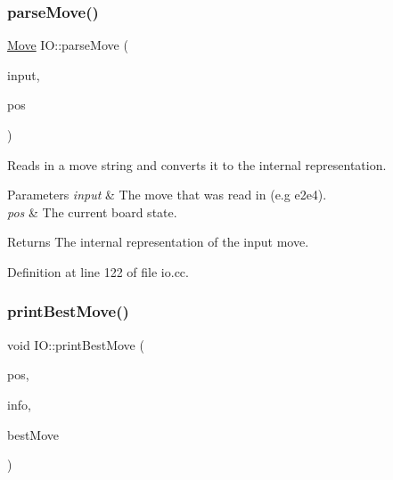 \subsubsection{\texorpdfstring{parse\+Move()}{parseMove()}}
{\footnotesize\ttfamily \mbox{\hyperlink{classMove}{Move}} I\+O\+::parse\+Move (\begin{DoxyParamCaption}\item[{std\+::string}]{input,  }\item[{const \mbox{\hyperlink{classBoard}{Board}} \&}]{pos }\end{DoxyParamCaption})\hspace{0.3cm}{\ttfamily [noexcept]}}



Reads in a move string and converts it to the internal representation. 


\begin{DoxyParams}{Parameters}
{\em input} & The move that was read in (e.\+g e2e4). \\
\hline
{\em pos} & The current board state. \\
\hline
\end{DoxyParams}
\begin{DoxyReturn}{Returns}
The internal representation of the input move. 
\end{DoxyReturn}


Definition at line 122 of file io.\+cc.

\mbox{\label{namespaceIO_a308ab394cf5fd18910986fbe556d01bb}} 
\subsubsection{\texorpdfstring{print\+Best\+Move()}{printBestMove()}}
{\footnotesize\ttfamily void I\+O\+::print\+Best\+Move (\begin{DoxyParamCaption}\item[{\mbox{\hyperlink{classBoard}{Board}} \&}]{pos,  }\item[{const \mbox{\hyperlink{structSearchInfo}{Search\+Info}} \&}]{info,  }\item[{const \mbox{\hyperlink{classMove}{Move}} \&}]{best\+Move }\end{DoxyParamCaption})\hspace{0.3cm}{\ttfamily [noexcept]}}



